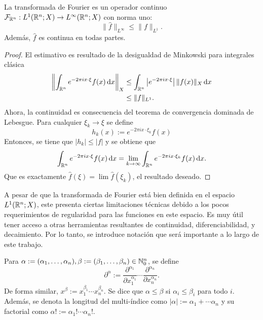 \begin{proposition}
    La transformada de Fourier es un operador continuo 
    $\mathcal{F}_{\mathbb{R}^n} : L^1(\mathbb{R}^n;X) \rightarrow L^\infty(\mathbb{R}^n;X)$ con norma uno:
    \begin{equation*}
        \|\widehat{f}\|_{L^\infty} \leq \|f\|_{L^1}.
    \end{equation*}
    Además, $\widehat{f}$ es continua en todas partes. 
\end{proposition}
\begin{proof}
    El estimativo es resultado de la desigualdad de Minkowski para integrales
    clásica 
    \begin{align*}
        \left\|
            \int_{\mathbb{R}^n} e^{-2\pi i x \cdot \xi} f(x) \mathop{}\!\mathrm{d} x
        \right\|_X & \leq 
        \int_{\mathbb{R}^n} \left|e^{-2\pi i x \cdot \xi}\right|\| f(x)\|_X \mathop{}\!\mathrm{d} x\\
        & \leq \|f\|_{L^1}.
    \end{align*}
    Ahora, la continuidad es consecuencia del teorema de convergencia dominada
    de Lebesgue. Para cualquier $\xi_k \rightarrow \xi$ se define 
    \begin{equation*}
        h_k(x) :=  e^{-2\pi i x \cdot \xi_k} f(x)
    \end{equation*}
    Entonces, se tiene que $|h_k| \leq |f|$ y se obtiene que 
    \begin{equation*}
        \int_{\mathbb{R}^n} e^{-2\pi i x \cdot \xi} f(x) \mathop{}\!\mathrm{d} x = 
        \lim_{k\rightarrow\infty}\int_{\mathbb{R}^n} e^{-2\pi i x \cdot \xi_k} f(x) \mathop{}\!\mathrm{d} x.
    \end{equation*} 
    Que es exactamente $\widehat{f}(\xi) = \lim \widehat{f}(\xi_k)$, el 
    resultado deseado.
\end{proof}
A pesar de que la transformada de Fourier está bien definida en el espacio
$L^1(\mathbb{R}^n;X)$, este presenta ciertas limitaciones técnicas debido a los pocos
requerimientos de regularidad para las funciones en este espacio. Es muy útil
tener acceso a otras herramientas resultantes de continuidad, diferenciabilidad,
y decaimiento.
Por lo tanto, se introduce notación que será importante a lo largo de este trabajo. 
\begin{definition}
    Para $\alpha:=(\alpha_1, \ldots, \alpha_n), \beta:=(\beta_1, \ldots, \beta_n) 
    \in \mathbb{N}_0^n$, se define 
    \begin{equation*}
        \partial^\alpha := \frac{\partial^{\alpha_1}}{\partial x_1^{\alpha_1}}
        \cdots \frac{\partial^{\alpha_n}}{\partial x_n^{\alpha_n}}.
    \end{equation*}
    De forma similar, $x^\beta := x_1^{\beta_1} \cdots x_n^{\beta_n}$. Se dice 
    que $\alpha \leq \beta$ si $\alpha_i \leq \beta_i$ para todo $i$. Además, 
    se denota la longitud del multi-índice como
    $|\alpha| := \alpha_1 + \cdots \alpha_n$ y su factorial como
    $\alpha! := \alpha_1! \cdots \alpha_n!$.
\end{definition}

